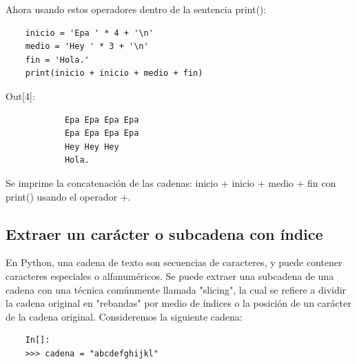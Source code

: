 Ahora usando estos operadores dentro de la sentencia  {\ttfamily print()}: 
\begin{lstlisting} 
	inicio = 'Epa ' * 4 + '\n'
	medio = 'Hey ' * 3 + '\n'
	fin = 'Hola.'
	print(inicio + inicio + medio + fin)
\end{lstlisting}

{\ttfamily\scriptsize\scriptsize 
	\hspace{-0.65cm}Out[4]:\vspace{-0.15cm}	
	{\color{blue} 	
		\begin{verbatim}		
			Epa Epa Epa Epa 
			Epa Epa Epa Epa 
			Hey Hey Hey 
			Hola.
		\end{verbatim}
}} 

Se imprime la concatenación de las cadenas:  {\ttfamily inicio + inicio + medio + fin} con {\ttfamily print()} usando el operador {\ttfamily +}.


\subsection{Extraer un carácter o subcadena con índice  {\ttfamily[]}}

En Python, una cadena de texto son secuencias de caracteres, y puede contener caracteres especiales o alfanuméricos. Se puede extraer una subcadena de una cadena con una técnica comúnmente llamada "slicing", la cual se refiere a dividir la cadena original en "{}rebandas"{} por medio de índices o la posición de un carácter de la cadena original.  Consideremos la siguiente cadena:

\begin{lstlisting}
	In[]:	
	>>> cadena = "abcdefghijkl"
\end{lstlisting}

